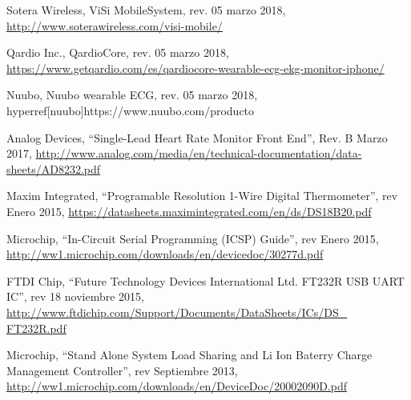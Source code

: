 \renewcommand{\refname}{Referencias}
\begin{thebibliography}{99}

 Sotera Wireless, ViSi Mobile\textregistered  System, rev. 05 marzo 2018, \hyperref[visi]{http://www.soterawireless.com/visi-mobile/}

 Qardio Inc., QardioCore, rev.  05 marzo 2018, \hyperref[qardio]{https://www.getqardio.com/es/qardiocore-wearable-ecg-ekg-monitor-iphone/}

 Nuubo, Nuubo wearable ECG, rev. 05 marzo 2018, hyperref[nuubo]{https://www.nuubo.com/producto}

 Analog Devices, ``Single-Lead Heart Rate Monitor Front End'', Rev. B Marzo 2017, \hyperref[ad8232]{http://www.analog.com/media/en/technical-documentation/data-sheets/AD8232.pdf}

 Maxim Integrated, ``Programable Resolution 1-Wire Digital Thermometer'', rev Enero 2015, \hyperref[temp]{https://datasheets.maximintegrated.com/en/ds/DS18B20.pdf}

 Microchip, ``In-Circuit Serial Programming (ICSP) Guide'', rev Enero 2015, \hyperref[temp]{http://ww1.microchip.com/downloads/en/devicedoc/30277d.pdf}

 FTDI Chip, ``Future Technology Devices International Ltd. FT232R USB UART IC'', rev 18 noviembre 2015, \hyperref[temp]{http://www.ftdichip.com/Support/Documents/DataSheets/ICs/DS\_ FT232R.pdf}

 Microchip, ``Stand\- Alone System Load Sharing and Li\- Ion Baterry Charge Management Controller'', rev Septiembre 2013, \hyperref[temp]{http://ww1.microchip.com/downloads/en/DeviceDoc/20002090D.pdf}

%
%
\end{thebibliography}